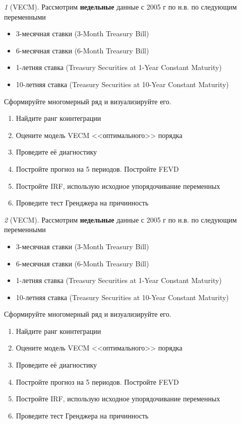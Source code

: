 \documentclass[12pt]{article}
\theoremstyle{remark}
\newtheorem{exercise}{}[subsection]
\begin{document}
\begin{exercise}[VECM]
Рассмотрим \textbf{недельные} данные с 2005 г по н.в. по следующим переменными
\begin{itemize}
	\item 3-месячная ставки (3-Month Treasury Bill)
	\item 6-месячная ставки (6-Month Treasury Bill)
	\item 1-летняя ставка (Treasury Securities at 1-Year Constant Maturity)
	\item 10-летняя ставка (Treasury Securities at 10-Year Constant Maturity)
\end{itemize}
Сформируйте многомерный ряд и визуализируйте его.
\begin{enumerate}
	\item Найдите ранг коинтеграции
	\item Оцените модель VECM <<оптимального>> порядка
	\item Проведите её диагностику
	\item Постройте прогноз на 5 периодов. Постройте FEVD
	\item Постройте IRF, использую исходное упорядочивание переменных
	\item Проведите тест Гренджера на причинность
\end{enumerate}
\end{exercise}

\begin{exercise}[VECM]
Рассмотрим \textbf{недельные} данные с 2005 г по н.в. по следующим переменными
\begin{itemize}
	\item 3-месячная ставки (3-Month Treasury Bill)
	\item 6-месячная ставки (6-Month Treasury Bill)
	\item 1-летняя ставка (Treasury Securities at 1-Year Constant Maturity)
	\item 10-летняя ставка (Treasury Securities at 10-Year Constant Maturity)
\end{itemize}
Сформируйте многомерный ряд и визуализируйте его.
\begin{enumerate}
	\item Найдите ранг коинтеграции
	\item Оцените модель VECM <<оптимального>> порядка
	\item Проведите её диагностику
	\item Постройте прогноз на 5 периодов. Постройте FEVD
	\item Постройте IRF, использую исходное упорядочивание переменных
	\item Проведите тест Гренджера на причинность
\end{enumerate}
\end{exercise}
\end{document}
